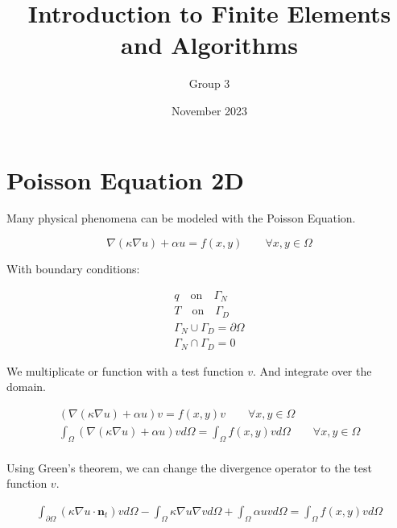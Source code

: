 \documentclass{article}
\title{Introduction to Finite Elements and Algorithms}
\author{Group 3}
\date{November 2023}
\begin{document}
\maketitle

\section{Poisson Equation 2D}

Many physical phenomena can be modeled with the Poisson Equation.

\begin{equation}\label{eq:2D_Poisson}
    \nabla\left(\kappa\nabla u \right) +\alpha u= f(x,y) \qquad \forall x,y\in \Omega
\end{equation}

With boundary conditions:

\begin{equation}\label{eq:2D_PoissonBC}
    \begin{gathered}
        q \quad \text{on} \quad \Gamma_{N} \\
        T \quad \text{on} \quad \Gamma_{D}  \\ 
        \Gamma_{N} \cup \Gamma_{D} = \partial \Omega \\
        \Gamma_{N} \cap \Gamma_{D} = {0}
    \end{gathered}    
\end{equation}

We multiplicate or function with a test function $v$. And integrate over the domain. 

\begin{equation}\label{eq:2D_PoissonInt}
    \begin{gathered}
        \left(\nabla\left(\kappa\nabla u \right)+\alpha u\right) v  = f(x,y) v \qquad \forall x,y\in \Omega \\
        \int_{\Omega}{\left(\nabla\left(\kappa\nabla u \right)+\alpha u\right) v d\Omega}=\int_{\Omega}{f(x,y) v d\Omega} \qquad \forall x,y\in \Omega \\
    \end{gathered}
\end{equation}

Using Green's theorem, we can change the divergence operator to the test function $v$.

\begin{equation}\label{eq:2D_Poisson_Weak}
    \begin{gathered}
        \int_{\partial\Omega}{\left(\kappa\nabla u \cdot\textbf{n}_t\right) v d\Omega}-\int_{\Omega}{\kappa\nabla u  \nabla v d\Omega}+\int_{\Omega}{\alpha u v d\Omega}=\int_{\Omega}{f(x,y) v d\Omega}\\
    \end{gathered}
\end{equation}
\end{document}
